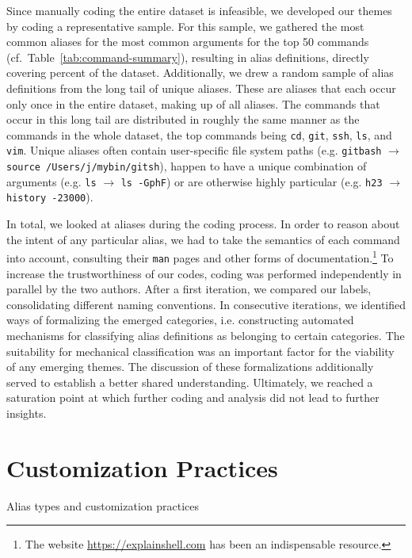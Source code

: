 \documentclass[smallextended,natbib]{svjour3}
\newcommand{\num}[1]{\numprint{#1}}
\newcommand{\per}[1]{\numprint[\%]{#1}}
\newcommand{\alias}[2]{{\texttt{#1} $\rightarrow$ \texttt{#2}}}
\newcommand{\cmd}[1]{{\texttt{#1}}}
\begin{document}
Since manually coding the entire dataset is infeasible, we developed our themes by coding a representative sample.
For this sample, we gathered the most common aliases for the most common arguments for the top 50 commands (cf.\ Table~\ref{tab:command-summary}), resulting in \num{1381} alias definitions, directly covering \per{28.77} percent of the dataset.
Additionally, we drew a random sample of \num{200} alias definitions from the long tail of unique aliases.
These are aliases that each occur only once in the entire dataset, making up \per{27.53} of all aliases.
The commands that occur in this long tail are distributed in roughly the same manner as the commands in the whole dataset, the top commands being \cmd{cd}, \cmd{git}, \cmd{ssh}, \cmd{ls}, and \cmd{vim}.
Unique aliases often contain user-specific file system paths (e.g. \alias{gitbash}{source /Users/j/mybin/gitsh}), happen to have a unique combination of arguments (e.g. \alias{ls}{ls -GphF}) or are otherwise highly particular (e.g. \alias{h23}{history -23000}).

In total, we looked at \num{1581} aliases during the coding process.
In order to reason about the intent of any particular alias, we had to take the semantics of each command into account, consulting their \texttt{man} pages and other forms of documentation.\footnote{The website \url{https://explainshell.com} has been an indispensable resource.}
To increase the trustworthiness of our codes, coding was performed independently in parallel by the two authors.
After a first iteration, we compared our labels, consolidating different naming conventions.
In consecutive iterations, we identified ways of formalizing the emerged categories, i.e. constructing automated mechanisms for classifying alias definitions as belonging to certain categories.
The suitability for mechanical classification was an important factor for the viability of any emerging themes.
The discussion of these formalizations additionally served to establish a better shared understanding.
Ultimately, we reached a saturation point at which further coding and analysis did not lead to further insights.

\section{Customization Practices}

\begin{table}
    \centering
	\caption{Alias types and customization practices}
    \label{tab:practices}
    
\end{table}
\end{document}
